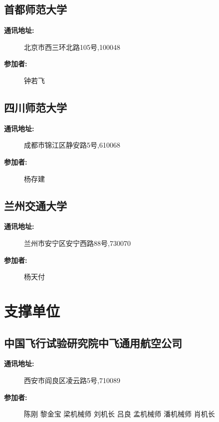 \documentclass[letterpaper,10pt,english]{sphinxmanual}
\begin{document}
\subsection{首都师范大学}
\label{water_partner:id27}\begin{description}
\item[{\textbf{通讯地址:}}] \leavevmode
北京市西三环北路105号,100048

\item[{\textbf{参加者:}}] \leavevmode
钟若飞

\end{description}


\subsection{四川师范大学}
\label{water_partner:id28}\begin{description}
\item[{\textbf{通讯地址:}}] \leavevmode
成都市锦江区静安路5号,610068

\item[{\textbf{参加者:}}] \leavevmode
杨存建

\end{description}


\subsection{兰州交通大学}
\label{water_partner:id29}\begin{description}
\item[{\textbf{通讯地址:}}] \leavevmode
兰州市安宁区安宁西路88号,730070

\item[{\textbf{参加者:}}] \leavevmode
杨天付

\end{description}


\section{支撑单位}
\label{water_partner:id30}

\subsection{中国飞行试验研究院中飞通用航空公司}
\label{water_partner:id31}\begin{description}
\item[{\textbf{通讯地址:}}] \leavevmode
西安市阎良区凌云路5号,710089

\item[{\textbf{参加者:}}] \leavevmode
陈刚
黎金宝
梁机械师
刘机长
吕良
孟机械师
潘机械师
肖机长

\end{description}
\end{document}
